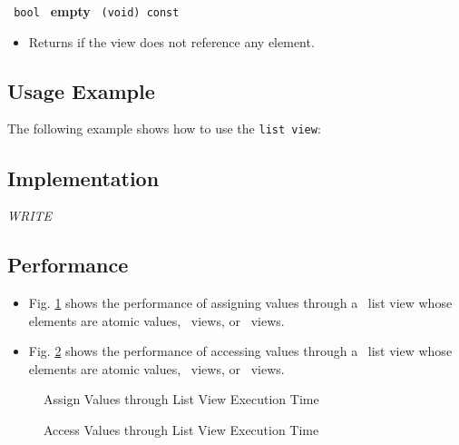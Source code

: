 \noindent
\texttt{%
bool
}
\newline
\textbf{empty}%
\texttt{%
(void) const
}

\begin{itemize}
\item
Returns if the view does not reference any element.
\end{itemize}

\subsection{Usage Example} \label{sec-list-vw-use}

The following example shows how to use the \texttt{list view}:


\subsection{Implementation} \label{sec-list-vw-impl}

\textit{WRITE}

\subsection{Performance} \label{sec-list-vw-perf}

\begin{itemize}
\item
Fig. \ref{fig:list-vw-assign-exper}
shows the performance of assigning values through a \stapl\ list view
whose elements are atomic values, \stl\ views, or \stapl\ views.
\item
Fig. \ref{fig:list-vw-access-exper}
shows the performance of accessing values through a \stapl\ list view
whose elements are atomic values, \stl\ views, or \stapl\ views.
\end{itemize}

\begin{figure}[p]
\caption{Assign Values through List View Execution Time}
\label{fig:list-vw-assign-exper}
\end{figure}

\begin{figure}[p]
\caption{Access Values through List View Execution Time}
\label{fig:list-vw-access-exper}
\end{figure}

